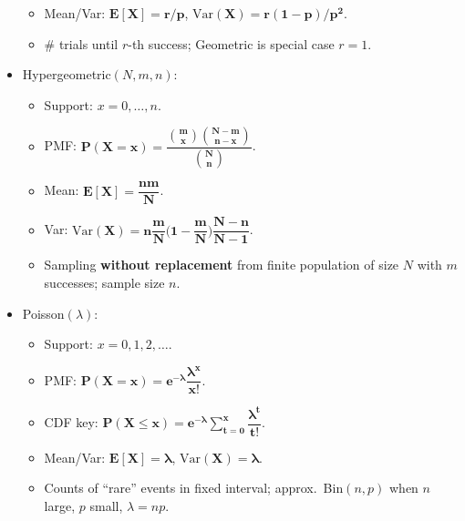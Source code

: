 \documentclass[11pt,landscape]{article}
\begin{document}
\begin{multicols}{3}
\begin{itemize}
\begin{itemize}
      \item Mean/Var: $\mathbf{E[X]=r/p}$, $\mathbf{\mathrm{Var}(X)=r(1-p)/p^2}$.
      \item \# trials until $r$-th success; Geometric is special case $r=1$.
    \end{itemize}
  \item Hypergeometric$(N,m,n)$:
    \begin{itemize}
      \item Support: $x=0,\dots,n$.
      \item PMF: $\mathbf{P(X=x)=\dfrac{\binom{m}{x}\binom{N-m}{n-x}}{\binom{N}{n}}}$.
      \item Mean: $\mathbf{E[X]=\dfrac{nm}{N}}$.
      \item Var: $\mathbf{\mathrm{Var}(X)=n\dfrac{m}{N}\Big(1-\dfrac{m}{N}\Big)\dfrac{N-n}{N-1}}$.
      \item Sampling \textbf{without replacement} from finite population of size $N$ with $m$ successes; sample size $n$.
    \end{itemize}
  \item Poisson$(\lambda)$:
    \begin{itemize}
      \item Support: $x=0,1,2,\dots$.
      \item PMF: $\mathbf{P(X=x)=e^{-\lambda}\dfrac{\lambda^x}{x!}}$.
      \item CDF key: $\mathbf{P(X\le x)=e^{-\lambda}\sum_{t=0}^x \dfrac{\lambda^t}{t!}}$.
      \item Mean/Var: $\mathbf{E[X]=\lambda}$, $\mathbf{\mathrm{Var}(X)=\lambda}$.
      \item Counts of “rare” events in fixed interval; approx.\ Bin$(n,p)$ when $n$ large, $p$ small, $\lambda=np$.
    \end{itemize}
\end{itemize}


\end{multicols}
\end{document}
